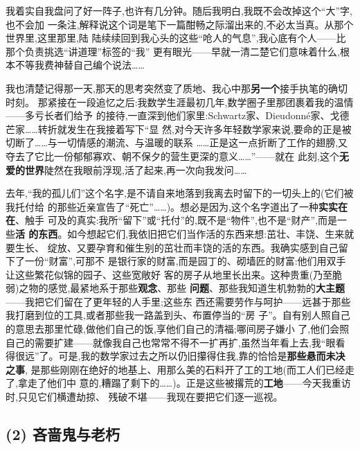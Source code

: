 我着实自我盘问了好一阵子,也许有几分钟。随后我明白,我既不会改掉这个“大”字,也不会加
一条注,解释说这个词是笔下一篇酣畅之际溜出来的,不必太当真。从那个世界里,这里那里,陆
陆续续回到我心头的这些“呛人的气息”,我心底有个人——比那个负责挑选“讲道理”标签的“我”
更有眼光——早就一清二楚它们意味着什么,根本不等我费神替自己编个说法……

我也清楚记得那一天,那天的思考突然变了质地、我心中那\textbf{另一个}接手执笔的确切时刻。
那紧接在一段追忆之后:我数学生涯最初几年,数学圈子里那团裹着我的温情——多亏长者们给予
的接待,一直深到他们家里:Schwartz家、Dieudonné家、戈德芒家……转折就发生在我接着写下“显
然,对今天许多年轻数学家来说,要命的正是被切断了……与一切情感的潮流、与温暖的联系
……正是这一点折断了工作的翅膀,又夺去了它比一份郁郁寡欢、朝不保夕的营生更深的意义……”——就在
此刻,这个\textbf{无爱的世界}陡然在我眼前浮现,活了起来,再一次向我发问……

去年,“我的孤儿们”这个名字,是不请自来地落到我离去时留下的一切头上的(它们被我托付给
的那些近亲宣告了“死亡”……)。想必是因为,这个名字\dmark{}道出了一种\textbf{实实在在}、触手
可及的真实:我所“留下”或“托付”的,既不是“物件”,也不是“财产”,而是一些\textbf{活
的东西}。如今想起它们,我依旧把它们当作活的东西来想:茁壮、丰饶、生来就要生长、
绽放、又要孕育和催生别的茁壮而丰饶的活的东西。我确实感到自己留下了一份“财富”,可那不
是银行家的财富,而是园丁的、砌墙匠的财富:他们用双手让这些繁花似锦的园子、这些宽敞好
客的房子从地里长出来。这种贵重(乃至脆弱)之物的感觉,最紧地系于那些\textbf{观念}、那些
\textbf{问题}、那些我知道生机勃勃的\textbf{大主题}——我把它们留在了更年轻的人手里;这些东
西还需要劳作与呵护——远甚于那些我打磨到位的工具,或者那些我一路盖到头、布置停当的“房
子”。自有别人照自己的意思去那里忙碌,做他们自己的饭,享他们自己的清福;哪间房子嫌小
了,他们会照自己的需要扩建——就像我自己也常常不得不一扩再扩,虽然当年看上去,我“眼看
得很远”了。可是,我的数学家过去之所以仍旧攥得住我,靠的恰恰是\textbf{那些悬而未决之事},
是那些刚刚在绝好的地基上、用那么美的石料开了工的工地(而工人们已经走了,拿走了他们中
意的,糟蹋了剩下的……)。正是这些被撂荒的\textbf{工地}——今天我重访时,只见它们横遭劫掠、
残破不堪——我现在要把它们逐一巡视。

\subsection{(2) 吝啬鬼与老朽}   %


